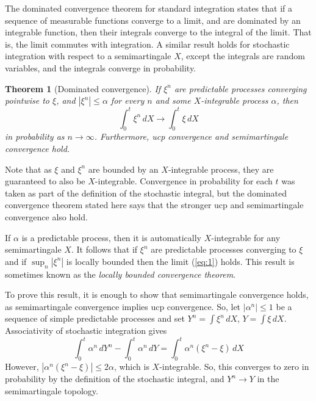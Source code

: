 \documentclass[12pt]{article}
\newtheorem*{theorem*}{Theorem}
\begin{document}

The dominated convergence theorem for standard integration states that if a sequence of measurable functions converge to a limit, and are dominated by an integrable function, then their integrals converge to the integral of the limit. That is, the limit commutes with integration. A similar result holds for stochastic integration with respect to a semimartingale $X$, except the integrals are random variables, and the integrals converge in probability.

\begin{theorem*}[Dominated convergence]
If $\xi^n$ are predictable processes converging pointwise to $\xi$, and $|\xi^n|\le\alpha$ for every $n$ and some $X$-integrable process $\alpha$, then
\begin{equation}\label{eq:1}
\int_0^t\xi^n\,dX\rightarrow\int_0^t\xi\,dX
\end{equation}
in probability as $n\rightarrow\infty$. Furthermore, ucp convergence and semimartingale convergence hold.
\end{theorem*}

Note that as $\xi$ and $\xi^n$ are bounded by an $X$-integrable process, they are guaranteed to also be $X$-integrable. Convergence in probability for each $t$ was taken as part of the definition of the stochastic integral, but the dominated convergence theorem stated here says that the stronger ucp and semimartingale convergence also hold.

If $\alpha$ is a  predictable process, then it is automatically $X$-integrable for any semimartingale $X$. It follows that if $\xi^n$ are predictable processes converging to $\xi$ and if $\sup_n|\xi^n|$ is locally bounded then the limit (\ref{eq:1}) holds. This result is sometimes known as the \emph{locally bounded convergence theorem}.


To prove this result, it is enough to show that semimartingale convergence holds, as semimartingale convergence implies ucp convergence.
So, let $|\alpha^n|\le 1$ be a sequence of simple predictable processes and set $Y^n=\int\xi^n\,dX$, $Y=\int\xi\,dX$. Associativity of stochastic integration gives
\begin{equation*}
\int_0^t\alpha^n\,dY^n-\int_0^t\alpha^n\,dY
=\int_0^t \alpha^n(\xi^n-\xi)\,dX
\end{equation*}
However, $|\alpha^n(\xi^n-\xi)|\le 2\alpha$, which is $X$-integrable. So, this converges to zero in probability by the definition of the stochastic integral, and $Y^n\rightarrow Y$ in the semimartingale topology.

\end{document}
